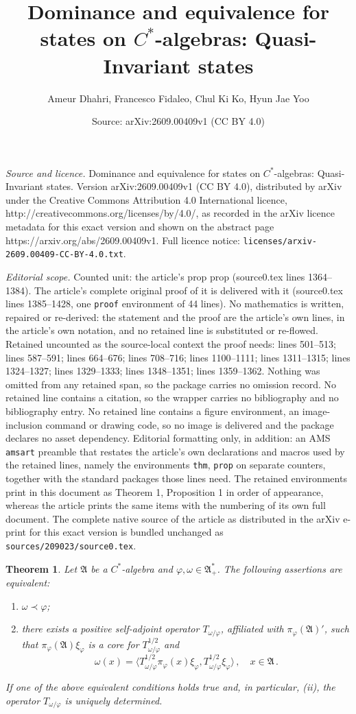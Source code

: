 \documentclass[10pt,a4paper]{amsart}
\title{Dominance and equivalence for states on $C^*$-algebras: Quasi-Invariant states}
\author{Ameur Dhahri, Francesco Fidaleo, Chul Ki Ko, Hyun Jae Yoo}
\date{Source: arXiv:2609.00409v1 (CC BY 4.0)}
\newtheorem{thm}{Theorem}
\def\f{\varphi}\def\ff{\phi} \def\F{\Phi}
\def\ga{{\mathfrak A}} \def\gpa{{\mathfrak a}}
\def\om{\omega} \def\Om{\Omega}
\begin{document}
\maketitle

\noindent\emph{Source and licence.} Dominance and equivalence for states on $C^*$-algebras: Quasi-Invariant states. Version arXiv:2609.00409v1 (CC BY 4.0), distributed by arXiv under the Creative Commons Attribution 4.0 International licence, http://creativecommons.org/licenses/by/4.0/, as recorded in the arXiv licence metadata for this exact version and shown on the abstract page https://arxiv.org/abs/2609.00409v1. Full licence notice: \texttt{licenses/arxiv-2609.00409-CC-BY-4.0.txt}.\par\smallskip

\noindent\textit{Editorial scope.} Counted unit: the article's prop prop (source0.tex lines 1364--1384). The article's complete original proof of it is delivered with it (source0.tex lines 1385--1428, one \texttt{proof} environment of 44 lines). No mathematics is written, repaired or re-derived: the statement and the proof are the article's own lines, in the article's own notation, and no retained line is substituted or re-flowed.  Retained uncounted as the source-local context the proof needs: lines 501--513; lines 587--591; lines 664--676; lines 708--716; lines 1100--1111; lines 1311--1315; lines 1324--1327; lines 1329--1333; lines 1348--1351; lines 1359--1362.  Nothing was omitted from any retained span, so the package carries no omission record.  No retained line contains a citation, so the wrapper carries no bibliography and no bibliography entry.  No retained line contains a figure environment, an image-inclusion command or drawing code, so no image is delivered and the package declares no asset dependency.  Editorial formatting only, in addition: an AMS \texttt{amsart} preamble that restates the article's own declarations and macros used by the retained lines, namely the environments \texttt{thm}, \texttt{prop} on separate counters, together with the standard packages those lines need.  The retained environments print in this document as Theorem 1, Proposition 1 in order of appearance, whereas the article prints the same items with the numbering of its own full document.  The complete native source of the article as distributed in the arXiv e-print for this exact version is bundled unchanged as \texttt{sources/209023/source0.tex}.
\begin{thm}
\label{main}
Let $\ga$ be a $C^*$-algebra and $\f,\om\in\ga^*_+$. The following assertions are equivalent:
\begin{enumerate} 
\item[(i)] $\om\prec\f$;
\item[(ii)] there exists a positive self-adjoint operator $T_{\om/\f}$, affiliated with $\pi_\f(\ga)'$, such that 
$\pi_\f(\ga)\xi_\f$ is a core for $T_{\om/\f}^{1/2}$ and
$$
\om(x)=\big\langle T_{\om/\f}^{1/2}\pi_\f(x)\xi_\f,T_{\om/\f}^{1/2}\xi_\f\big\rangle\,,\quad x\in\ga\,.
$$
\end{enumerate}
If one of the above equivalent conditions holds true and, in particular, (ii), the operator $T_{\om/\f}$ is uniquely determined.
\end{thm}
\end{document}
